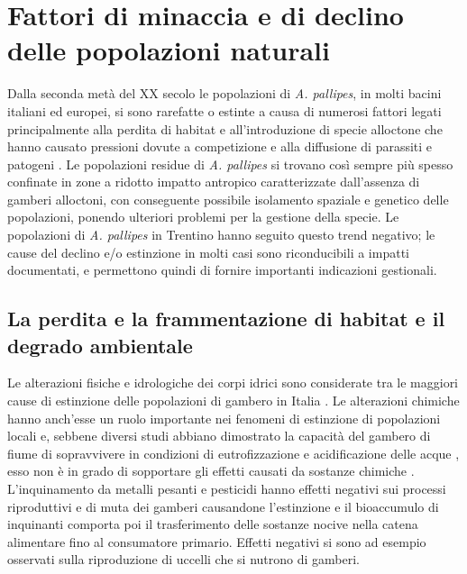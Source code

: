 \documentclass[11pt,a4paper,italian,twoside,openany]{memoir}
\begin{document}
\section{Fattori di minaccia e di declino delle popolazioni naturali} 
Dalla seconda metà del XX secolo le popolazioni di \emph{A. pallipes}, in molti bacini italiani ed europei, si sono rarefatte o estinte a causa di numerosi fattori legati principalmente alla perdita di habitat e all'introduzione di specie alloctone che hanno causato pressioni dovute a competizione e alla diffusione di parassiti e patogeni \cite{Aquiloni 2010}. Le popolazioni residue di \emph{A. pallipes} si trovano così sempre più spesso confinate in zone a ridotto impatto antropico caratterizzate dall'assenza di gamberi alloctoni, con conseguente possibile isolamento spaziale e genetico delle popolazioni, ponendo ulteriori problemi per la gestione della specie. Le popolazioni di \emph{A. pallipes} in Trentino hanno seguito questo trend negativo; le cause del declino e/o estinzione in molti casi sono riconducibili a impatti documentati, e permettono quindi di fornire importanti indicazioni gestionali.

\subsection{La perdita e la frammentazione di habitat e il degrado ambientale}
Le alterazioni fisiche e idrologiche dei corpi idrici sono considerate tra le maggiori cause di estinzione delle popolazioni di gambero in Italia \cite{Fureder 2003b} \cite{Sint 2007} \cite{Brusconi 2008} \cite{Aquiloni 2010}. Le alterazioni chimiche hanno anch'esse un ruolo importante nei fenomeni di estinzione di popolazioni locali e, sebbene diversi studi abbiano dimostrato la capacità del gambero di fiume di sopravvivere in condizioni di eutrofizzazione e acidificazione delle acque \cite{Demers 2002}, esso non è in grado di sopportare gli effetti causati da sostanze chimiche \cite{Renai 2006}. L'inquinamento da metalli pesanti e pesticidi hanno effetti negativi sui processi riproduttivi e di muta dei gamberi causandone l'estinzione \cite{Nystrom 2002} e il bioaccumulo di inquinanti comporta poi il trasferimento delle sostanze nocive nella catena alimentare fino al consumatore primario. Effetti negativi si sono ad esempio osservati sulla riproduzione di uccelli che si nutrono di gamberi.
\end{document}
